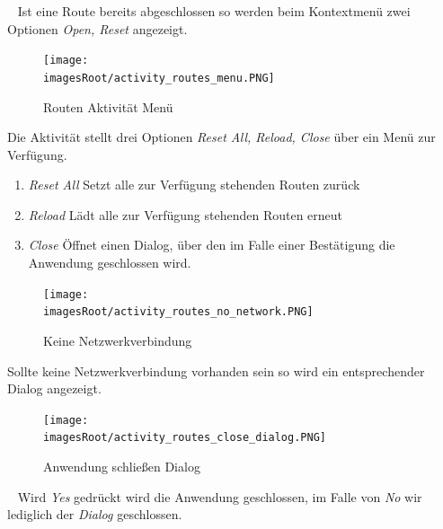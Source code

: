 \documentclass[11pt, a4paper, twoside]{article}   	%
\newcommand{\imagesRoot}{images}
\begin{document}
\ \newline
Ist eine Route bereits abgeschlossen so werden beim Kontextmenü zwei Optionen \emph{Open, Reset} angezeigt.
\newpage
\begin{figure}[h]
	\centering
	\texttt{[image: \\imagesRoot/activity\_routes\_menu.PNG]}
	\caption
	{Routen Aktivität Menü}
\end{figure}
Die Aktivität stellt drei Optionen \emph{Reset All, Reload,  Close} über ein Menü zur Verfügung.
\begin{enumerate}
	\item\emph{Reset All}
	\newline
	Setzt alle zur Verfügung stehenden Routen zurück
	\item\emph{Reload}
	\newline
	Lädt alle zur Verfügung stehenden Routen erneut
	\item\emph{Close}
	\newline
	Öffnet einen Dialog, über den im Falle einer Bestätigung die Anwendung geschlossen wird.
\end{enumerate}
\begin{figure}[h]
	\centering
	\texttt{[image: \\imagesRoot/activity\_routes\_no\_network.PNG]}
	\caption
	{Keine Netzwerkverbindung}
\end{figure}
Sollte keine Netzwerkverbindung vorhanden sein so wird ein entsprechender Dialog angezeigt.
\begin{figure}[h]
	\centering
	\texttt{[image: \\imagesRoot/activity\_routes\_close\_dialog.PNG]}
	\caption
	{Anwendung schließen Dialog}
\end{figure}
\ \newline
Wird \emph{Yes} gedrückt wird die Anwendung geschlossen, im Falle von \emph{No} wir lediglich der \emph{Dialog} geschlossen.
\newpage
\end{document}
